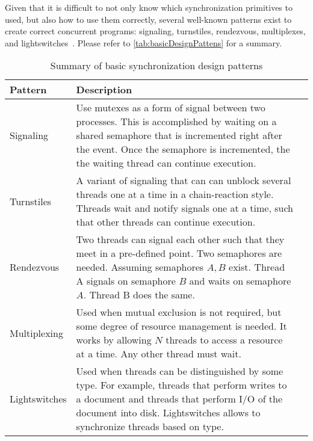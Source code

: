 Given that it is difficult to not only know which synchronization
primitives to used, but also how to use them correctly,
several well-known patterns exist to create
correct concurrent programs: signaling,
turnstiles, rendezvous, multiplexes, and lightswitches~\cite{csf2025synchronizationDesign}.
Please refer to \autoref{tab:basicDesignPattens} for a summary.


\begin{table}[!htp]
    \caption{Summary of basic synchronization design patterns}
    \label{tab:basicDesignPattens}
    \centering
    \begin{tabularx}{\textwidth}{|l|X|X|}
        \hline
        \textbf{Pattern} & \textbf{Description}\\
        \hline
        Signaling & 
        Use mutexes as a form of signal between two processes. This is
        accomplished by waiting on a shared semaphore that is incremented
        right after the event. Once the semaphore is incremented, the
        the waiting thread can continue execution.\\
        \hline
        Turnstiles & 
        A variant of signaling that can can unblock several threads
        one at a time in a chain-reaction style. Threads wait
        and notify signals one at a time, such that other threads
        can continue execution.\\
        \hline
        Rendezvous & 
        Two threads can signal each other such that they meet
        in a pre-defined point. Two semaphores are needed. Assuming
        semaphores $A, B$ exist. Thread A signals on semaphore $B$ and
        waits on semaphore $A$. Thread B does the same.\\
        \hline
        Multiplexing &
        Used when mutual exclusion is not required, but some
        degree of resource management is needed. It works
        by allowing $N$ threads to access a resource at a time.
        Any other thread must wait.\\
        \hline
        Lightswitches &
        Used when threads can be distinguished by some
        type. For example, threads that perform writes to
        a document and threads that perform I/O of the document
        into disk. Lightswitches allows to synchronize
        threads based on type.\\
        \hline
    \end{tabularx}
\end{table}


